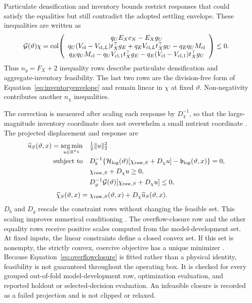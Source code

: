 \documentclass[a4paper,fleqn]{cas-sc}
\DeclareMathOperator*{\argminop}{arg\,min}
\newcommand{\R}{\mathbb{R}}
\newcommand{\col}{\operatorname{col}}
\begin{document}
Particulate densification and inventory bounds restrict responses that could satisfy the equalities but still contradict the adopted settling envelope. These inequalities are written as
\begin{equation}
\mathcal G(\vartheta)\chi=
\col\!\left(
\begin{array}{c}
q_UE_Xc_N-E_Xg_U\\
q_U(V_{\rm cl}-V_{{\rm cl},L})t_X^\top g_E
+q_EV_{{\rm cl},L}t_X^\top g_U-q_Eq_UM_{\rm cl}\\
q_Eq_UM_{\rm cl}-q_UV_{{\rm cl},1}t_X^\top g_E
-q_E(V_{\rm cl}-V_{{\rm cl},1})t_X^\top g_U
\end{array}\right)\le0.
\label{eq:G}
\end{equation}
Thus $n_g=F_X+2$ inequality rows describe particulate densification and aggregate-inventory feasibility. The last two rows are the division-free form of Equation~\eqref{eq:inventoryenvelope} and remain linear in $\chi$ at fixed $\vartheta$. Non-negativity contributes another $n_\chi$ inequalities.

The correction is measured after scaling each response by $D_\chi^{-1}$, so that the large-magnitude inventory coordinate does not overwhelm a small nutrient coordinate \citep{SturmSilva2025}. The projected displacement and response are \citep{Selerio2026,Valente2025}
\begin{align}
\widehat u_S(\vartheta,x)=\argminop_{u\in\R^{n_\chi}}\quad&\tfrac12\|u\|_2^2
\label{eq:projection}\\
\text{subject to}\quad&
 D_b^{-1}\{\mathcal H_{\log}(\vartheta)[\chi_{{\rm raw},S}+D_\chi u]-\mathfrak b_{\log}(\vartheta,x)\}=0,\notag\\
&\chi_{{\rm raw},S}+D_\chi u\ge0,\notag\\
&D_g^{-1}\mathcal G(\vartheta)[\chi_{{\rm raw},S}+D_\chi u]\le0,\notag\\[1mm]
\widehat\chi_S(\vartheta,x)={}&\chi_{{\rm raw},S}(\vartheta,x)+D_\chi\widehat u_S(\vartheta,x).
\label{eq:projected}
\end{align}
$D_b$ and $D_g$ rescale the constraint rows without changing the feasible set. This scaling improves numerical conditioning \citep[Section~11.8.2]{Boyd2004}. The overflow-closure row and the other equality rows receive positive scales computed from the model-development set. At fixed inputs, the linear constraints define a closed convex set. If this set is nonempty, the strictly convex, coercive objective has a unique minimizer \citep{Boyd2004}. Because Equation~\eqref{eq:overflowclosure} is fitted rather than a physical identity, feasibility is not guaranteed throughout the operating box. It is checked for every grouped out-of-fold model-development row, optimization evaluation, and reported holdout or selected-decision evaluation. An infeasible closure is recorded as a failed projection and is not clipped or relaxed.
\end{document}

